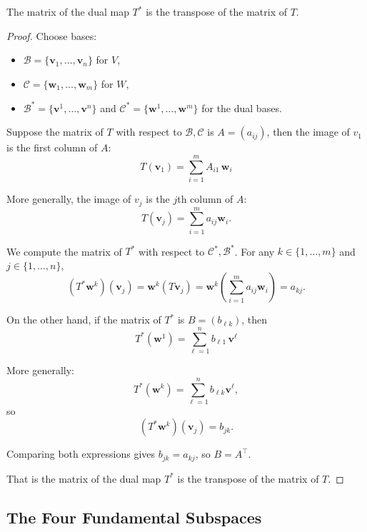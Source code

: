 \begin{theorem}
The matrix of the dual map $ T^* $ is the transpose of the matrix of $ T $.
\begin{proof}
Choose bases:

\begin{itemize}
\item $ \mathcal{B} = \{ \mathbf{v}_1, \dots, \mathbf{v}_n \} $ for $ V $,
    \item $ \mathcal{C} = \{ \mathbf{w}_1, \dots, \mathbf{w}_m \} $ for $ W $,
    \item $ \mathcal{B}^* = \{ \mathbf{v}^1, \dots, \mathbf{v}^n \} $ and $ \mathcal{C}^* = \{ \mathbf{w}^1, \dots, \mathbf{w}^m \} $ for the dual bases.
\end{itemize}


Suppose the matrix of $ T $ with respect to $ \mathcal{B}, \mathcal{C} $ is $ A = (a_{ij})$, then the image of $v_1$ is the first column of $A$:
\[
T(\mathbf{v}_1) = \sum_{i=1}^{m} A_{i1} \, \mathbf{w}_i
\]

More generally, the image of $v_j$ is the $j$th column of $A$:
\[
T(\mathbf{v}_j) = \sum_{i=1}^m a_{ij} \mathbf{w}_i.
\]

We compute the matrix of $ T^* $ with respect to $ \mathcal{C}^*, \mathcal{B}^* $.  
For any $ k \in \{1, \dots, m\} $ and $ j \in \{1, \dots, n\} $,
\[
(T^* \mathbf{w}^k)(\mathbf{v}_j) = \mathbf{w}^k(T \mathbf{v}_j) = \mathbf{w}^k\left( \sum_{i=1}^m a_{ij} \mathbf{w}_i \right) = a_{kj}.
\]

On the other hand, if the matrix of $ T^* $ is $ B = (b_{\ell k}) $, then
\[
T^*(\mathbf{w}^1) = \sum_{\ell=1}^{n} b_{\ell 1} \, \mathbf{v}^\ell
\]


More generally:
\[
T^*(\mathbf{w}^k) = \sum_{\ell=1}^n b_{\ell k} \mathbf{v}^\ell,
\]
so
\[
(T^* \mathbf{w}^k)(\mathbf{v}_j) = b_{j k}.
\]

Comparing both expressions gives $ b_{j k} = a_{k j} $, so $ B = A^\top $.


That is the matrix of the dual map $ T^* $ is the transpose of the matrix of $ T $.
\end{proof}
\end{theorem}










\subsection{\Large The Four Fundamental Subspaces}


